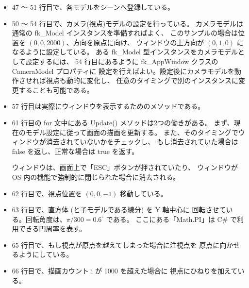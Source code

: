 \begin{itemize}
\item 47 〜 51 行目で、各モデルをシーンへ登録している。

\item 50 〜 54 行目で、カメラ(視点)モデルの設定を行っている。
	カメラモデルは通常の fk\_Model インスタンスを準備すればよく、
	このサンプルの場合は位置を	\((0,0, 2000)\)、方向を原点に向け、
	ウィンドウの上方向が \((0, 1, 0)\) になるように設定している。
	ある fk\_Model 型インスタンスをカメラモデルとして設定するには、
	54 行目にあるように fk\_AppWindow クラスの CameraModel プロパティに
	設定を行えばよい。設定後にカメラモデルを動作させれば視点も動的に変化し、
	任意のタイミングで別のインスタンスに変更することも可能である。
	
\item 57 行目は実際にウィンドウを表示するためのメソッドである。

\item 61 行目の for 文中にある Update() メソッドは2つの働きがある。
	まず、現在のモデル設定に従って画面の描画を更新する。
	また、そのタイミングでウィンドウが消去されていないかをチェックし、
	もし消去されていた場合は false を返し、正常な場合は true を返す。

	ウィンドウは、画面上で「ESC」ボタンが押されていたり、
	ウィンドウが OS 内の機能で強制的に閉じられた場合に消去される。

 \item 62 行目で、視点位置を \((0, 0, -1)\) 移動している。
 \item 63 行目で、直方体 (と子モデルである線分) を Y 軸中心に
	回転させている。回転角度は、\(\pi/300 = 0.6 ^{\circ}\) である。
	ここにある「Math.PI」は C\# で利用できる円周率を表す。
 \item 65 行目で、もし視点が原点を越えてしまった場合に注視点を
	原点に向かせるようにしている。
 \item 66 行目で、描画カウント i が 1000 を超えた場合に
	視点にひねりを加えている。
\end{itemize} ~
